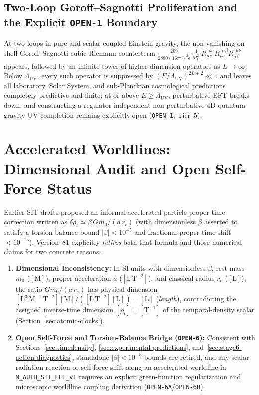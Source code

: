 \subsection{Two-Loop Goroff--Sagnotti Proliferation and the Explicit \texttt{OPEN-1} Boundary}

At two loops in pure and scalar-coupled Einstein gravity, the non-vanishing on-shell Goroff--Sagnotti cubic Riemann counterterm $\frac{209}{2880(16\pi^2)^2\epsilon}\,\frac{1}{M_{\mathrm{Pl}}^2}R_{\mu\nu}^{\ \ \rho\sigma}R_{\rho\sigma}^{\ \ \alpha\beta}R_{\alpha\beta}^{\ \ \mu\nu}$ appears, followed by an infinite tower of higher-dimension operators as $L \to \infty$. Below $\Lambda_{\mathrm{UV}}$, every such operator is suppressed by $(E/\Lambda_{\mathrm{UV}})^{2L+2} \ll 1$ and leaves all laboratory, Solar System, and sub-Planckian cosmological predictions completely predictive and finite; at or above $E \ge \Lambda_{\mathrm{UV}}$, perturbative EFT breaks down, and constructing a regulator-independent non-perturbative 4D quantum-gravity UV completion remains explicitly open (\texttt{OPEN-1}, Tier~5).

\section{Accelerated Worldlines: Dimensional Audit and Open Self-Force Status}
\label{sec:electron-accel}

Earlier SIT drafts proposed an informal accelerated-particle proper-time correction written as $\delta\rho_t \simeq \beta\,G m_0 / (a\,r_e)$ (with dimensionless $\beta$ asserted to satisfy a torsion-balance bound $|\beta| < 10^{-5}$ and fractional proper-time shift $< 10^{-15}$). Version~81 explicitly \emph{retires} both that formula and those numerical claims for two concrete reasons:
\begin{enumerate}[leftmargin=2em]
  \item \textbf{Dimensional Inconsistency:} In SI units with dimensionless $\beta$, rest mass $m_0$ ($[\mathrm{M}]$), proper acceleration $a$ ($[\mathrm{L\,T^{-2}}]$), and classical radius $r_e$ ($[\mathrm{L}]$), the ratio $G m_0 / (a\,r_e)$ has physical dimension $[\mathrm{L^3\,M^{-1}\,T^{-2}}][\mathrm{M}] / ([\mathrm{L\,T^{-2}}][\mathrm{L}]) = [\mathrm{L}]$ (\emph{length}), contradicting the assigned inverse-time dimension $[\rho_t] = [\mathrm{T^{-1}}]$ of the temporal-density scalar (Section~\ref{sec:atomic-clocks}).
  \item \textbf{Open Self-Force and Torsion-Balance Bridge (\texttt{OPEN-6}):} Consistent with Sections~\ref{sec:timedensity}, \ref{sec:experimental-predictions}, and~\ref{sec:stage6-action-diagnostics}, standalone $|\beta| < 10^{-5}$ bounds are retired, and any scalar radiation-reaction or self-force shift along an accelerated worldline in \texttt{M\_AUTH\_SIT\_EFT\_v1} requires an explicit green-function regularization and microscopic worldline coupling derivation (\texttt{OPEN-6A}/\texttt{OPEN-6B}).
\end{enumerate}

